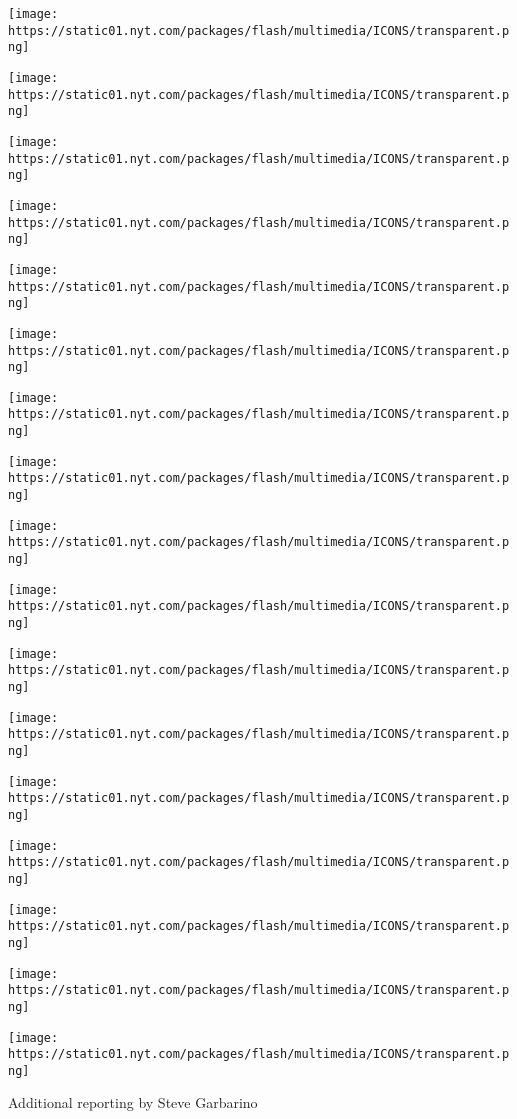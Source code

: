 \texttt{[image: https://static01.nyt.com/packages/flash/multimedia/ICONS/transparent.png]}

\texttt{[image: https://static01.nyt.com/packages/flash/multimedia/ICONS/transparent.png]}

\texttt{[image: https://static01.nyt.com/packages/flash/multimedia/ICONS/transparent.png]}

\texttt{[image: https://static01.nyt.com/packages/flash/multimedia/ICONS/transparent.png]}

\texttt{[image: https://static01.nyt.com/packages/flash/multimedia/ICONS/transparent.png]}

\texttt{[image: https://static01.nyt.com/packages/flash/multimedia/ICONS/transparent.png]}

\texttt{[image: https://static01.nyt.com/packages/flash/multimedia/ICONS/transparent.png]}

\texttt{[image: https://static01.nyt.com/packages/flash/multimedia/ICONS/transparent.png]}

\texttt{[image: https://static01.nyt.com/packages/flash/multimedia/ICONS/transparent.png]}

\texttt{[image: https://static01.nyt.com/packages/flash/multimedia/ICONS/transparent.png]}

\texttt{[image: https://static01.nyt.com/packages/flash/multimedia/ICONS/transparent.png]}

\texttt{[image: https://static01.nyt.com/packages/flash/multimedia/ICONS/transparent.png]}

\texttt{[image: https://static01.nyt.com/packages/flash/multimedia/ICONS/transparent.png]}

\texttt{[image: https://static01.nyt.com/packages/flash/multimedia/ICONS/transparent.png]}

\texttt{[image: https://static01.nyt.com/packages/flash/multimedia/ICONS/transparent.png]}

\texttt{[image: https://static01.nyt.com/packages/flash/multimedia/ICONS/transparent.png]}

\texttt{[image: https://static01.nyt.com/packages/flash/multimedia/ICONS/transparent.png]}

Additional reporting by Steve Garbarino

